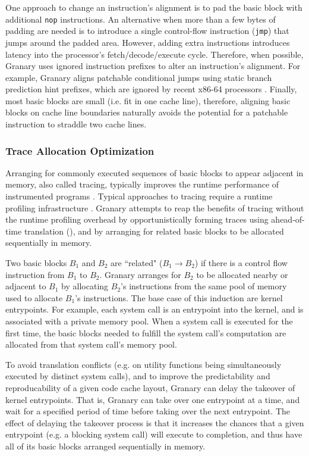 \documentclass[preprint]{sigplanconf}
\begin{document}
One approach to change an instruction's alignment is to pad the basic block with additional \texttt{nop} instructions. An alternative when more than a few bytes of padding are needed is to introduce a single control-flow instruction (\texttt{jmp}) that jumps around the padded area. However, adding extra instructions introduces latency into the processor's fetch/decode/execute cycle. Therefore, when possible, Granary uses ignored instruction prefixes to alter an instruction's alignment. For example, Granary aligns patchable conditional jumps using static branch prediction hint prefixes, which are ignored by recent x86-64 processors \cite{AgnerMicroarchitecture}. Finally, most basic blocks are small (i.e. fit in one cache line), therefore, aligning basic blocks on cache line boundaries naturally avoids the potential for a patchable instruction to straddle two cache lines.

\subsubsection{Trace Allocation Optimization}\label{sec:trace_alloc}
Arranging for commonly executed sequences of basic blocks to appear adjacent in memory, also called tracing, typically improves the runtime performance of instrumented programs \cite{DynamoRIO}. Typical approaches to tracing require a runtime profiling infrastructure \cite{DynamoRIOOptimization}. Granary attempts to reap the benefits of tracing without the runtime profiling overhead by opportunistically forming traces using ahead-of-time translation (), and by arranging for related basic blocks to be allocated sequentially in memory.

Two basic blocks $B_1$ and $B_2$ are ``related" ($B_1 \to B_2$) if there is a control flow instruction from $B_1$ to $B_2$. Granary arranges for $B_2$ to be allocated nearby or adjacent to $B_1$ by allocating $B_2$'s instructions from the same pool of memory used to allocate $B_1$'s instructions. The base case of this induction are kernel entrypoints. For example, each system call is an entrypoint into the kernel, and is associated with a private memory pool. When a system call is executed for the first time, the basic blocks needed to fulfill the system call's computation are allocated from that system call's memory pool.

To avoid translation conflicts (e.g. on utility functions being simultaneously executed by distinct system calls), and to improve the predictability and reproducability of a given code cache layout, Granary can delay the takeover of kernel entrypoints. That is, Granary can take over one entrypoint at a time, and wait for a specified period of time before taking over the next entrypoint. The effect of delaying the takeover process is that it increases the chances that a given entrypoint (e.g. a blocking system call) will execute to completion, and thus have all of its basic blocks  arranged sequentially in memory.
\end{document}
